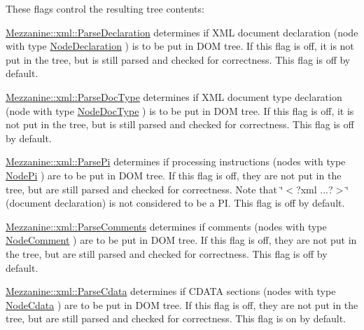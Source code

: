 These flags control the resulting tree contents:
\begin{DoxyItemize}
\item \hyperlink{namespaceMezzanine_1_1xml_a642e0534edcb90c314a3767941077cd0}{Mezzanine::xml::ParseDeclaration} determines if XML document declaration (node with type \hyperlink{namespaceMezzanine_1_1xml_a524d867e34ff408b8f45a51b7924cb80}{NodeDeclaration} ) is to be put in DOM tree. If this flag is off, it is not put in the tree, but is still parsed and checked for correctness. This flag is off by default.
\item \hyperlink{namespaceMezzanine_1_1xml_aea8775764346a3988ca2aef15beecd5e}{Mezzanine::xml::ParseDocType} determines if XML document type declaration (node with type \hyperlink{namespaceMezzanine_1_1xml_a524d867e34ff408b8f45a51b7924cb80}{NodeDocType} ) is to be put in DOM tree. If this flag is off, it is not put in the tree, but is still parsed and checked for correctness. This flag is off by default.
\item \hyperlink{namespaceMezzanine_1_1xml_ab7885d16db7e01d710dffb803fc9a896}{Mezzanine::xml::ParsePi} determines if processing instructions (nodes with type \hyperlink{namespaceMezzanine_1_1xml_a524d867e34ff408b8f45a51b7924cb80}{NodePi} ) are to be put in DOM tree. If this flag is off, they are not put in the tree, but are still parsed and checked for correctness. Note that \char`\"{}$<$?xml ...?$>$\char`\"{} (document declaration) is not considered to be a PI. This flag is off by default.
\item \hyperlink{namespaceMezzanine_1_1xml_af7f6768222908469cd315b24c4095f4f}{Mezzanine::xml::ParseComments} determines if comments (nodes with type \hyperlink{namespaceMezzanine_1_1xml_a524d867e34ff408b8f45a51b7924cb80}{NodeComment} ) are to be put in DOM tree. If this flag is off, they are not put in the tree, but are still parsed and checked for correctness. This flag is off by default.
\item \hyperlink{namespaceMezzanine_1_1xml_a33da07bddbf04d06d501881b3e13d616}{Mezzanine::xml::ParseCdata} determines if CDATA sections (nodes with type \hyperlink{namespaceMezzanine_1_1xml_a524d867e34ff408b8f45a51b7924cb80}{NodeCdata} ) are to be put in DOM tree. If this flag is off, they are not put in the tree, but are still parsed and checked for correctness. This flag is on by default.

\end{DoxyItemize}
